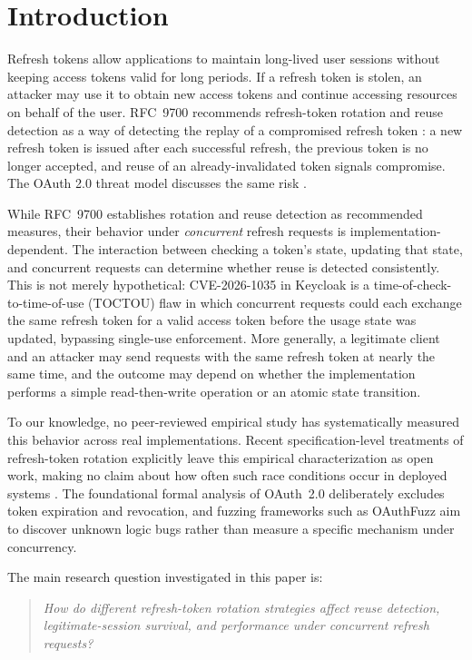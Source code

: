 \documentclass[conference]{IEEEtran}
\begin{document}
\section{Introduction}

Refresh tokens allow applications to maintain long-lived user sessions
without keeping access tokens valid for long periods. If a refresh token is
stolen, an attacker may use it to obtain new access tokens and continue
accessing resources on behalf of the user. RFC~9700 recommends refresh-token
rotation and reuse detection as a way of detecting the replay of a
compromised refresh token \cite{rfc9700}: a new refresh token is issued
after each successful refresh, the previous token is no longer accepted, and
reuse of an already-invalidated token signals compromise. The OAuth 2.0
threat model discusses the same risk \cite{rfc6819}.

While RFC~9700 establishes rotation and reuse detection as recommended
measures, their behavior under \emph{concurrent} refresh requests is
implementation-dependent. The interaction between checking a token's state,
updating that state, and concurrent requests can determine whether reuse is
detected consistently. This is not merely hypothetical: CVE-2026-1035
\cite{cve} in Keycloak is a time-of-check-to-time-of-use (TOCTOU) flaw in which concurrent
requests could each exchange the same refresh token for a valid access
token before the usage state was updated, bypassing single-use enforcement.
More generally, a legitimate client and an attacker may send requests with
the same refresh token at nearly the same time, and the outcome may depend
on whether the implementation performs a simple read-then-write operation
or an atomic state transition.

To our knowledge, no peer-reviewed empirical study has systematically
measured this behavior across real implementations. Recent
specification-level treatments of refresh-token rotation explicitly leave
this empirical characterization as open work, making no claim about how
often such race conditions occur in deployed systems \cite{nebula}. The
foundational formal analysis of OAuth~2.0 \cite{fett2016} deliberately
excludes token expiration and revocation, and fuzzing frameworks such as
OAuthFuzz \cite{oauthfuzz} aim to discover unknown logic bugs rather than
measure a specific mechanism under concurrency.

The main research question investigated in this paper is:

\begin{quote}
\emph{How do different refresh-token rotation strategies affect reuse
detection, legitimate-session survival, and performance under concurrent
refresh requests?}
\end{quote}
\end{document}
